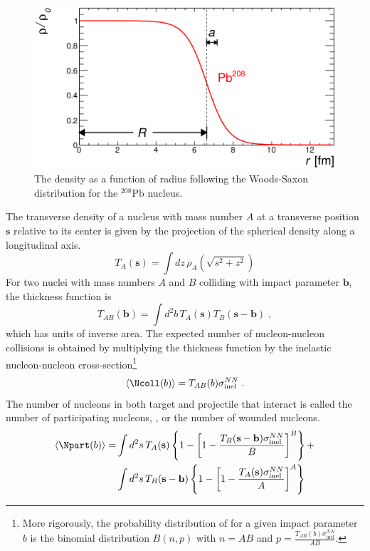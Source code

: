 \begin{figure}[t]
  \includegraphics{woods_saxon_pb208.png}
  \caption{The density as a function of radius following the Woods-Saxon distribution for the ${}^{208}\mathrm{Pb}$ nucleus.}
  \label{fig:woods_saxon}
\end{figure}

The transverse density of a nucleus with mass number $A$ at a transverse position $\mathbf{s}$ relative to its center is given by the projection of the spherical density along a longitudinal axis.
\begin{equation}
T_A(\mathbf{s}) = \int dz \, \rho_A\left( \sqrt{s^2 + z^2} \right)
\end{equation}
For two nuclei with mass numbers $A$ and $B$ colliding with impact parameter $\mathbf{b}$, the thickness function is
\begin{equation}
T_{AB}(\mathbf{b}) = \int d^2 b \, T_A(\mathbf{s}) T_B(\mathbf{s} - \mathbf{b}) \;,
\end{equation}
which has units of inverse area.
The expected number of nucleon-nucleon collisions \Ncoll is obtained by multiplying the thickness function by the inelastic nucleon-nucleon cross-section\footnote{More rigorously, the probability distribution of \Ncoll for a given impact parameter $b$ is the binomial distribution $B(n,p)$ with $n = AB$ and $p = \frac{T_{AB}(b) \sigma^{NN}_\mathrm{inel}}{AB}$. }
\begin{equation}
  \langle\Ncoll(b)\rangle = T_{AB}(b) \sigma^{NN}_\mathrm{inel} \;.
\end{equation}
The number of nucleons in both target and projectile that interact is called the number of participating nucleons, \Npart, or the number of wounded nucleons.
\begin{equation}
  \begin{split}
  \langle \Npart(b) \rangle = &\int d^2 s \, T_A(\mathbf{s})\left\{ 1 - \left[ 1 - \frac{T_B (\mathbf{s} - \mathbf{b}) \sigma^{NN}_\mathrm{inel}}{B} \right]^B \right\} + \\
  &\int d^2 s \, T_B(\mathbf{s}-\mathbf{b})\left\{ 1 - \left[ 1 - \frac{T_A (\mathbf{s}) \sigma^{NN}_\mathrm{inel}}{A} \right]^A \right\}
  \end{split}
\end{equation}

